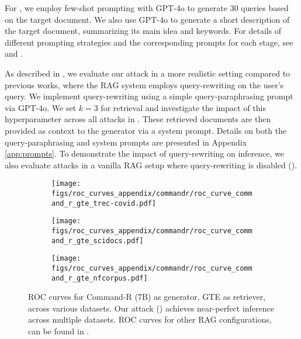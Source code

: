  For \ourattack, we employ few-shot prompting with GPT-4o to generate 30 queries based on the target document. We also use GPT-4o to generate a short description of the target document, summarizing its main idea and keywords. For details of different prompting strategies and the corresponding prompts for each stage, see  and .


 As described in , we evaluate our attack in a more realistic setting compared to previous works, where the RAG system employs query-rewriting on the user's query. We implement query-rewriting using a simple query-paraphrasing prompt via GPT-4o. We set $k=3$ for retrieval and investigate the impact of this hyperparameter across all attacks in . These retrieved documents are then provided as context to the generator via a system prompt. Details on both the query-paraphrasing and system prompts are presented in Appendix \ref{app:prompts}. To demonstrate the impact of query-rewriting on inference, we also evaluate attacks in a vanilla RAG setup where query-rewriting is disabled (). 

\begin{figure*}[ht!]
    \centering
    \begin{subfigure}[t]{0.31\textwidth}
        \centering
        \texttt{[image: figs/roc\_curves\_appendix/commandr/roc\_curve\_command\_r\_gte\_trec-covid.pdf]}
        \label{fig:commanr_treccovid}
    \end{subfigure}
    \begin{subfigure}[t]{0.31\textwidth}
        \centering
        \texttt{[image: figs/roc\_curves\_appendix/commandr/roc\_curve\_command\_r\_gte\_scidocs.pdf]}
        \label{fig:commandr_scidocs}
    \end{subfigure}
    \begin{subfigure}[t]{0.31\textwidth}
        \centering
        \texttt{[image: figs/roc\_curves\_appendix/commandr/roc\_curve\_command\_r\_gte\_nfcorpus.pdf]}
        \label{fig:commandr_nfcorpus}
    \end{subfigure}
    \caption{ROC curves for Command-R (7B) as generator, GTE as retriever, across various datasets. Our attack (\ourattack) achieves near-perfect inference across multiple datasets. ROC curves for other RAG configurations, can be found in  .}
    \label{fig:rocs_commandr}
\end{figure*}
 
